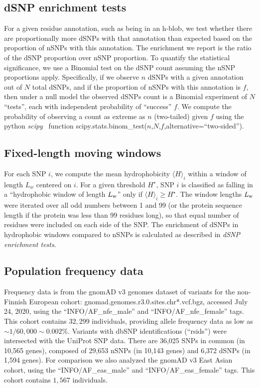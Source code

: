\documentclass[9pt,twocolumn,twoside,lineno]{pnas-new}
\newcommand{\aucomment}[1]{}
\newcommand{\inserted}[1]{{#1}}
\newcommand{\Ht}{H^{\star}}
\newcommand{\Lw}{L_{\rm w}}
\begin{document}
\subsection*{dSNP enrichment tests}
\aucomment{This explanation is a major revision of the previous version.}
\inserted{For a given residue annotation, such as being in an h-blob, we test whether there are proportionally more dSNPs with that annotation than expected based on the proportion of nSNPs with this annotation. The enrichment we report is the ratio of the dSNP proportion over nSNP proportion. To quantify the statistical significance, we use a Binomial test on the dSNP count assuming the nSNP proportions apply. Specifically, if we observe $n$ dSNPs with a given annotation out of $N$ total dSNPs, and if the proportion of nSNPs with this annotation is $f$, then under a null model the observed dSNPs count is a Binomial experiment of $N$ ``tests'', each with independent probability of ``success'' $f$. We compute the probability of observing a count as extreme as $n$ (two-tailed) given $f$ using the python {\em scipy}~\cite{scipy2020} function scipy.stats.binom\_test($n$,$N$,$f$,alternative=``two-sided'').
}

\subsection*{Fixed-length moving windows}
 For each SNP $i$, we compute the mean hydrophobicity $\langle H \rangle_i$ within a window of length $L_w$ centered on $i$. For a given threshold $\Ht$, SNP $i$ is classified as falling in a  ``hydrophobic window of length $\Lw$'' only if $\langle H \rangle_i \geq \Ht$.  The window lengths $\Lw$ were iterated over all odd numbers between 1 and 99 (or the protein sequence length if the protein was less than 99 residues long), so that equal number of residues were included on each side of the SNP. The enrichment of dSNPs in hydrophobic windows compared to nSNPs is calculated as described in {\em dSNP enrichment tests}.

\subsection*{Population frequency data}
Frequency data is from the gnomAD v3 genomes dataset of variants for the non-Finnish European cohort: gnomad.genomes.r3.0.sites.chr*.vcf.bgz, accessed July 24, 2020, using the ``INFO/AF\_nfe\_male'' and ``INFO/AF\_nfe\_female'' tags. This cohort contains $32,299$ individuals, providing allele frequency data as low as $\sim 1/60,000 \sim 0.002 \%$. Variants with dbSNP identifications (``rsids'') were intersected with the UniProt SNP data. There are 36,025 SNPs in common (in 10,565 genes), composed of 29,653 nSNPs (in 10,143 genes) and 6,372 dSNPs (in 1,594 genes). For comparison we also analyzed the gnomAD v3 East Asian cohort, using the ``INFO/AF\_eas\_male'' and ``INFO/AF\_eas\_female'' tags. This cohort contains $1,567$ individuals. 
\end{document}
